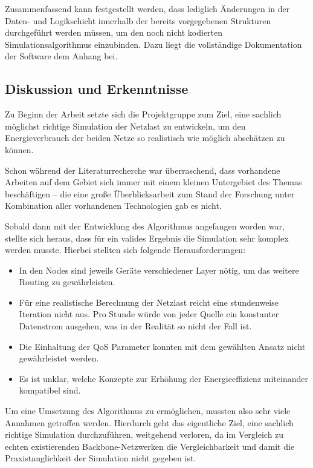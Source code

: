 Zusammenfassend kann festgestellt werden, dass lediglich Änderungen in der Daten- und Logikschicht innerhalb der bereits vorgegebenen Strukturen durchgeführt werden müssen, um den noch nicht kodierten Simulationsalgorithmus einzubinden. Dazu liegt die vollständige Dokumentation der Software dem Anhang bei.


\subsection{Diskussion und Erkenntnisse} \label{subsec:ErgDiskussion}

Zu Beginn der Arbeit setzte sich die Projektgruppe zum Ziel, eine sachlich möglichst richtige Simulation der Netzlast zu entwickeln, um den Energieverbrauch der beiden Netze so realistisch wie möglich abschätzen zu können. 

Schon während der Literaturrecherche war überraschend, dass vorhandene Arbeiten auf dem Gebiet sich immer mit einem kleinen Untergebiet des Themas beschäftigen -- die eine große Überblicksarbeit zum Stand der Forschung unter Kombination aller vorhandenen Technologien gab es nicht.

Sobald dann mit der Entwicklung des Algorithmus angefangen worden war, stellte sich heraus, dass für ein valides Ergebnis die Simulation sehr komplex werden musste. Hierbei stellten sich folgende Herausforderungen:
\begin{itemize}
	\item In den Nodes sind jeweils Geräte verschiedener Layer nötig, um das weitere Routing zu gewährleisten. 
	\item Für eine realistische Berechnung der Netzlast reicht eine stundenweise Iteration nicht aus. Pro Stunde würde von jeder Quelle ein konstanter Datenstrom ausgehen, was in der Realität so nicht der Fall ist.
	\item Die Einhaltung der QoS Parameter konnten mit dem gewählten Ansatz nicht ge\-währ\-lei\-stet werden.
	\item Es ist unklar, welche Konzepte zur Erhöhung der Energieeffizienz miteinander kompatibel sind.
\end{itemize}

Um eine Umsetzung des Algorithmus zu ermöglichen, mussten also sehr viele Annahmen getroffen werden. Hierdurch geht das eigentliche Ziel, eine sachlich richtige Simulation durchzuführen, weitgehend verloren, da im Vergleich zu echten existierenden Backbone-Netzwerken die Vergleichbarkeit und damit die Praxistauglichkeit der Simulation nicht gegeben ist.

